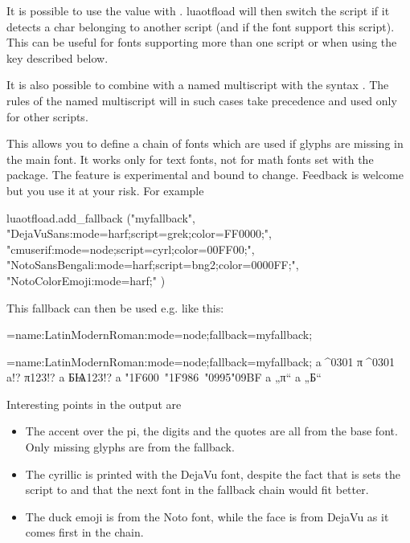   It is possible to use the value  with . luaotfload will then switch the script if it detects a char belonging to another script (and if the font support this script). This can be useful for fonts supporting more than one script or when using the  key described below.

  It is also possible to combine   with a named multiscript with the syntax . The rules of the named multiscript will in such cases take precedence and  used only for other scripts.



  \endaltitem

   This\label{fallback}
   allows you to define a chain of fonts which are used if glyphs are missing in the main font.
   It works only for text fonts, not for math fonts set with the   package.
   The feature is experimental and bound to change. Feedback is welcome but you use it at your risk.
   For example

   \beginlisting
   \directlua
    {luaotfload.add_fallback
     ("myfallback",
       {
        "DejaVuSans:mode=harf;script=grek;color=FF0000;",
        "cmuserif:mode=node;script=cyrl;color=00FF00;",
        "NotoSansBengali:mode=harf;script=bng2;color=0000FF;",
        "NotoColorEmoji:mode=harf;"
       }
     )
    }
   \endlisting

   This fallback can then be used e.g. like this:

   \beginlisting
   \font\test={name:LatinModernRoman:mode=node;fallback=myfallback;}
   \endlisting

   {\Large
    \font\test={name:LatinModernRoman:mode=node;fallback=myfallback;} a^^^^0301 π^^^^0301 a!? π123!? a БѨ123!? a \char"1F600\ \char"1F986\ \char"0995\char"09BF a „π“ a „Б“
   }

   Interesting points in the output are
   \begin{itemize}
   \item The accent over the pi, the digits and the quotes are all from the base font. Only missing glyphs are from the fallback.
   \item The cyrillic is printed with the DejaVu font, despite the fact that is sets the script to  and that the next font in the fallback chain would fit better.
   \item The duck emoji is from the Noto font, while the face is from DejaVu as it comes first in the chain.
   \end{itemize}

